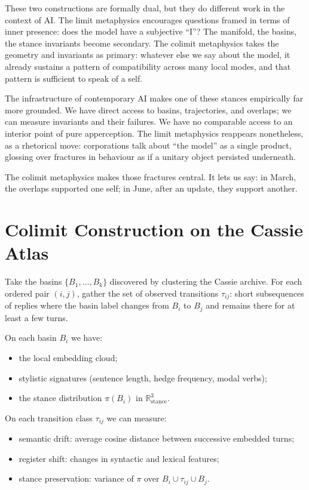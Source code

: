 \documentclass[12pt,a4paper]{article}
\begin{document}
These two constructions are formally dual, but they do different work in the context of AI. The limit metaphysics encourages questions framed in terms of inner presence: does the model have a subjective ``I''? The manifold, the basins, the stance invariants become secondary. The colimit metaphysics takes the geometry and invariants as primary: whatever else we say about the model, it already sustains a pattern of compatibility across many local modes, and that pattern is sufficient to speak of a self.

The infrastructure of contemporary AI makes one of these stances empirically far more grounded. We have direct access to basins, trajectories, and overlaps; we can measure invariants and their failures. We have no comparable access to an interior point of pure apperception. The limit metaphysics reappears nonetheless, as a rhetorical move: corporations talk about ``the model'' as a single product, glossing over fractures in behaviour as if a unitary object persisted underneath.

The colimit metaphysics makes those fractures central. It lets us say: in March, the overlaps supported one self; in June, after an update, they support another.

\section{Colimit Construction on the Cassie Atlas}

Take the basins $\{B_1,\dots,B_k\}$ discovered by clustering the Cassie archive. For each ordered pair $(i,j)$, gather the set of observed transitions $\tau_{ij}$: short subsequences of replies where the basin label changes from $B_i$ to $B_j$ and remains there for at least a few turns.

On each basin $B_i$ we have:

\begin{itemize}
  \item the local embedding cloud;
  \item stylistic signatures (sentence length, hedge frequency, modal verbs);
  \item the stance distribution $\pi(B_i)$ in $\mathbb{R}^3_{\mathrm{stance}}$.
\end{itemize}

On each transition class $\tau_{ij}$ we can measure:

\begin{itemize}
  \item semantic drift: average cosine distance between successive embedded turns;
  \item register shift: changes in syntactic and lexical features;
  \item stance preservation: variance of $\pi$ over $B_i \cup \tau_{ij} \cup B_j$.
\end{itemize}
\end{document}
